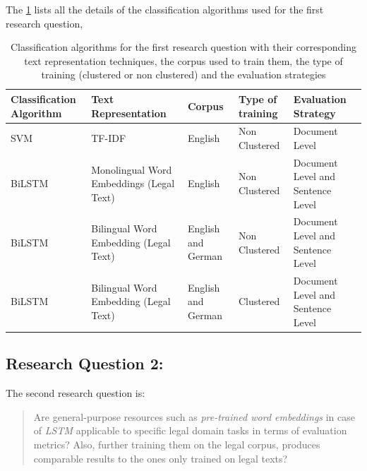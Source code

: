 \clearpage
The \ref{table:ListQuestionFirstQuestion} lists all the details of the classification algorithms used for the first research question,


\begin{table}[!ht]
\centering
\begin{tabular}{>{\centering\arraybackslash}m{3cm}>{\centering\arraybackslash}m{3cm}>{\centering\arraybackslash}m{1.5cm}>{\centering\arraybackslash}m{2.3cm}>{\centering\arraybackslash}m{3cm}}
\hline
\textbf{Classification Algorithm} & \textbf{Text Representation} & \textbf{Corpus} & \textbf{Type of training} & \textbf{Evaluation Strategy} \\ [0.2cm]\hline
\gls{SVM} & \gls{TF-IDF} & English & Non Clustered & Document Level \\[0.3cm]
\gls{BiLSTM} & Monolingual Word Embeddings (Legal Text) & English & Non Clustered & Document Level and Sentence Level \\[0.3cm]
\gls{BiLSTM} & Bilingual Word Embedding (Legal Text) & English and German & Non Clustered & Document Level and Sentence Level \\[0.3cm]
\gls{BiLSTM} & Bilingual Word Embedding (Legal Text) & English and German & Clustered & Document Level and Sentence Level \\ \hline
\end{tabular}
\captionsetup{justification=centering,margin=1cm}
\caption{Classification algorithms for the first research question with their corresponding text representation techniques, the corpus used to train them, the type of training (clustered or non clustered) and the evaluation strategies}
\label{table:ListQuestionFirstQuestion}
\end{table}



\subsection{Research Question 2:} \label{question2}
The second research question is:

\begin{quote}
    Are general-purpose resources such as \textit{pre-trained word embeddings} in case of \textit{LSTM} applicable to specific legal domain tasks in terms of evaluation metrics? Also, further training them on the legal corpus, produces comparable results to the ones only trained on legal texts?
\end{quote}



